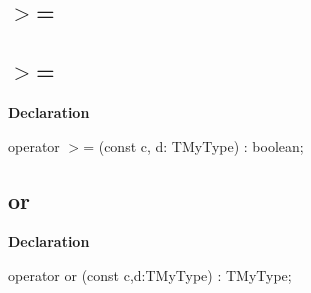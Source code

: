 \documentclass{report}
\newif\ifpdf
\begin{document}
\subsection*{\large{\textbf{{$>$}=}}\normalsize\hspace{1ex}\hrulefill}
\else
\subsection*{{$>$}=}
\fi
\label{ok_operator_test->=}
\index{{$>$}=}
\begin{list}{}{
\setlength{\itemindent}{0cm}
\setlength{\listparindent}{0cm}
\setlength{\leftmargin}{\evensidemargin}
\addtolength{\leftmargin}{\tmplength}
\settowidth{\labelsep}{X}
\addtolength{\leftmargin}{\labelsep}
\setlength{\labelwidth}{\tmplength}
}
\item[\textbf{Declaration}\hfill]
\ifpdf
\begin{flushleft}
\fi
\begin{ttfamily}
operator {$>$}= (const c, d: TMyType) : boolean;\end{ttfamily}

\ifpdf
\end{flushleft}
\fi

\end{list}
\ifpdf
\subsection*{\large{\textbf{or}}\normalsize\hspace{1ex}\hrulefill}
\else
\subsection*{or}
\fi
\label{ok_operator_test-or}
\begin{list}{}{
\setlength{\itemindent}{0cm}
\setlength{\listparindent}{0cm}
\setlength{\leftmargin}{\evensidemargin}
\addtolength{\leftmargin}{\tmplength}
\settowidth{\labelsep}{X}
\addtolength{\leftmargin}{\labelsep}
\setlength{\labelwidth}{\tmplength}
}
\item[\textbf{Declaration}\hfill]
\ifpdf
\begin{flushleft}
\fi
\begin{ttfamily}
operator or (const c,d:TMyType) : TMyType;\end{ttfamily}

\ifpdf
\end{flushleft}
\fi

\end{list}
\ifpdf
\end{document}
